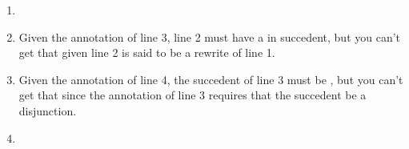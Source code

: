 \begin{enumerate}
 \newcommand{\blanksp}{\_\_}

 \begin{enumerate}
	\setlength{\itemsep}{2em}

  \item 
\begin{argumentN}[1]

 \ai{\blanksp}{r}{A}


\end{argumentN}


\item 
\begin{argumentN}[1]


\ai{\blanksp}{\blanksp}{1}


\end{argumentN}

\opts{

 \dotline
 \dotline

}
{
 Given the annotation of line 3, line 2 must have a  in succedent, but you 
can't get that given line 2 is said to be a rewrite of line 1.}

\item 
\begin{argumentN}[1]



\ai{s}{\blanksp}{2,\disjI}


\end{argumentN}

\opts{

 \dotline
 \dotline

}
{
 Given the annotation of line 4, the succedent of line 3 must be , 
 but you can't get that since the annotation of line 3 requires that the 
 succedent be a disjunction.
}

\item 
\begin{argumentN}[1]


\end{argumentN}
\end{enumerate}
\end{enumerate}
